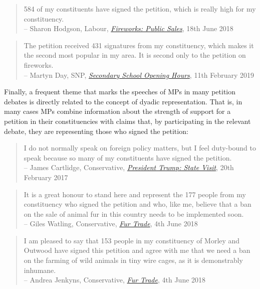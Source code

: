 \documentclass[12pt]{article}
\begin{document}
\begin{quote}
584 of my constituents have signed the petition, which is really high for my constituency. \\ 
-- Sharon Hodgson, Labour, \href{https://hansard.parliament.uk/commons/2018-11-26/debates/C95047CD-F24E-44DA-BE73-FC571B014CEF/FireworksPublicSales}{\emph{Fireworks: Public Sales}}, 18th June 2018
\end{quote}


\begin{quote}
The petition received 431 signatures from my constituency, which makes it the second most popular in my area. It is second only to the petition on fireworks. \\ 
-- Martyn Day, SNP, \href{https://hansard.parliament.uk/commons/2019-02-11/debates/E0FFB632-2FCA-4341-A9E1-CA6CFAE6BCEF/SecondarySchoolOpeningHours}{\emph{Secondary School Opening Hours}}, 11th February 2019
\end{quote}

Finally, a frequent theme that marks the speeches of MPs in many petition debates is directly related to the concept of dyadic representation. That is, in many cases MPs combine information about the strength of support for a petition in their constituencies with claims that, by participating in the relevant debate, they are representing those who signed the petition:

\begin{quote}
I do not normally speak on foreign policy matters, but I feel duty-bound to speak because so many of my constituents have signed the petition. \\ 
-- James Cartlidge, Conservative, \href{https://hansard.parliament.uk/commons/2017-02-20/debates/34847E5C-8B14-46E6-8251-AE99526CC011/PresidentTrumpStateVisit}{\emph{President Trump: State Visit}}, 20th February 2017
\end{quote}

\begin{quote}
It is a great honour to stand here and represent the 177 people from my constituency who signed the petition and who, like me, believe that a ban on the sale of animal fur in this country needs to be implemented soon.\\ 
-- Giles Watling, Conservative, \href{https://hansard.parliament.uk/Commons/2018-06-04/debates/8F9B6212-E631-4151-ABA7-AED8560CBBEB/FurTrade}{\emph{Fur Trade}}, 4th June 2018
\end{quote}

\begin{quote}
I am pleased to say that 153 people in my constituency of Morley and Outwood have signed this petition and agree with me that we need a ban on the farming of wild animals in tiny wire cages, as it is demonstrably inhumane. \\ 
-- Andrea Jenkyns, Conservative, \href{https://hansard.parliament.uk/Commons/2018-06-04/debates/8F9B6212-E631-4151-ABA7-AED8560CBBEB/FurTrade}{\emph{Fur Trade}}, 4th June 2018
\end{quote}
\end{document}
